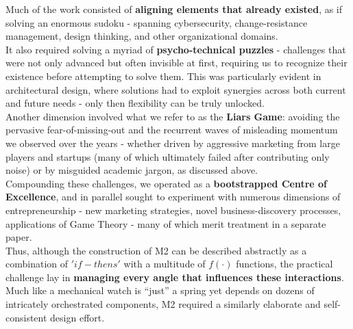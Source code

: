 \documentclass{article}
\begin{document}
Much of the work consisted of \textbf{aligning elements that already existed}, as if solving an enormous sudoku - spanning cybersecurity, change-resistance management, design thinking, and other organizational domains.\\

It also required solving a myriad of \textbf{psycho-technical puzzles} - challenges that were not only advanced but often invisible at first, requiring us to recognize their existence before attempting to solve them. This was particularly evident in architectural design, where solutions had to exploit synergies across both current and future needs - only then flexibility can be truly unlocked.\\

Another dimension involved what we refer to as the \textbf{Liars Game}: avoiding the pervasive fear-of-missing-out and the recurrent waves of misleading momentum we observed over the years - whether driven by aggressive marketing from large players and startups (many of which ultimately failed after contributing only noise) or by misguided academic jargon, as discussed above.\\

Compounding these challenges, we operated as a \textbf{bootstrapped Centre of Excellence}, and in parallel sought to experiment with numerous dimensions of entrepreneurship - new marketing strategies, novel business-discovery processes, applications of Game Theory - many of which merit treatment in a separate paper.\\

Thus, although the construction of M2 can be described abstractly as a combination of \begin{math} 'if-thens'\end{math} with a multitude of \begin{math} f(·)\end{math} functions, the practical challenge lay in \textbf{managing every angle that influences these interactions}. Much like a mechanical watch is “just” a spring yet depends on dozens of intricately orchestrated components, M2 required a similarly elaborate and self-consistent design effort.\\
\end{document}
